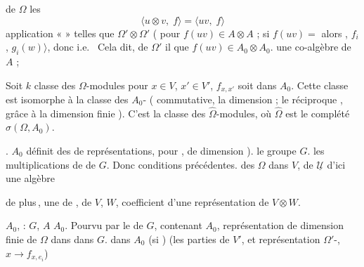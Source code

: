 \documentclass[11pt,a4paper]{article}
\begin{document}

\ill{} de $\Omega$ \ill{} les \ill{}  \ill{}
\[ \langle u \otimes v,\; f \rangle = \langle uv,\; f \rangle \]
\ill{}  \ill{} application « \ill{} »
\ill{} telles que $\Omega' \otimes \Omega'$ ( \ill{} pour \ill{}
$f(uv) \in A \otimes A$ ; \ill{} si $f(uv) =$ \ill{} alors \ill{}, $f_i$,
$g_i(w) \rangle$, donc \ill{} \ill{} i.e.\ \ill{} Cela dit,
\struck{\ill{}} de $\Omega'$ \ill{} \ill{} il \ill{} que
$f(uv) \in A_{0} \otimes A_{0}$. \ill{} une \ill{} co-algèbre de $A$ ;



Soit $k$ \ill{} classe des $\Omega$-modules \ill{}  pour
$x \in V$, $x' \in V'$, $f_{x,x'}$ soit dans $A_{0}$. Cette classe \ill{} est
isomorphe à la classe des $A_{0}$- ( \ill{} \ill{}
commutative, \ill{} \ill{} la dimension ; le réciproque \ill{}, grâce à la
dimension finie ). C'est \ill{} la classe des $\hat{\Omega}$-modules, où
$\hat{\Omega}$ est le complété \ill{} $\sigma(\Omega, A_{0})$.

\ill{}  \ill{}. $A_{0}$ définit \ill{} \ill{} des
 de représentations, \ill{} pour \ill{}, \ill{}
\ill{} de dimension ). \ill{} le groupe $G$. \ill{} les multiplications de
\ill{} de $G$.  Donc \ill{} conditions précédentes. \ill{}
\ill{} des $\Omega$ dans $V$, \ill{} de $\underline{\mathcal{U}}$
 \ill{} d'ici une \ill{} algèbre


de plus\,, une \ill{} \ill{} de \ill{}, \struck{\ill{}} de $V$,
\ill{} $W$, \ill{} coefficient d'une représentation de $V \otimes W$.

\struck{\ill{}}

\ill{} $A_{0}$, \ill{} \ill{} : $G$, \ill{} $A$ \ill{} $A_{0}$. Pourvu \ill{}
par le \ill{} de $G$, contenant $A_{0}$, \struck{\ill{}} \ill{} représentation
de dimension finie de $\Omega$ dans \ill{} dans $G$.
 \ill{} dans $A_{0}$ (si \ill{})
(les \ill{} parties \ill{} de $V'$, et \ill{} \ill{} représentation
$\Omega'$-\ill{}, $x \to f_{x,e_i}$) 

\end{document}
